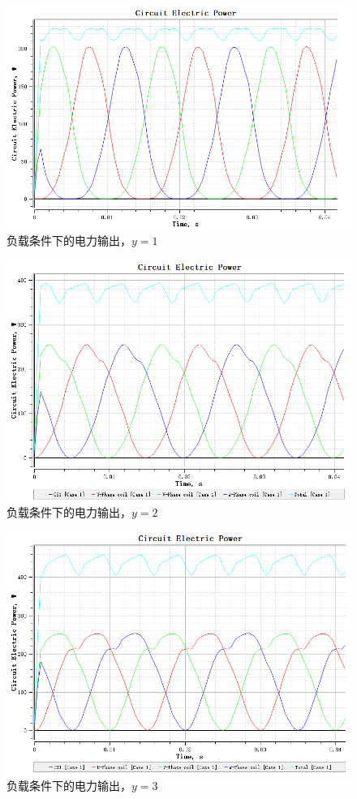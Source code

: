 \documentclass{thuemp}
\begin{document}
\begin{figure}[H]
  \centering
  \includegraphics[width=1\linewidth]{./img/task2/power-y1-load.png}
  \caption{负载条件下的电力输出，$y=1$}
\end{figure}
\begin{figure}[H]
  \centering
  \includegraphics[width=1\linewidth]{./img/task2/power-y2-load.png}
  \caption{负载条件下的电力输出，$y=2$}
\end{figure}
\begin{figure}[H]
  \centering
  \includegraphics[width=1\linewidth]{./img/task2/power-y3-load.png}
  \caption{负载条件下的电力输出，$y=3$}
\end{figure}
\end{document}
